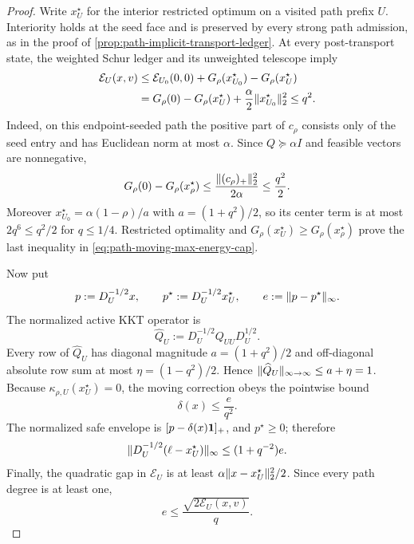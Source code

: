 \begin{proof}
Write $x_{U}^{\star}$ for the interior restricted optimum on a visited path
prefix $U$.  Interiority holds at the seed face and is preserved by every
strong path admission, as in the proof of
\cref{prop:path-implicit-transport-ledger}.  At every post-transport state,
the weighted Schur ledger and its unweighted telescope imply
\begin{align}
 \mathcal E_U(x,v)
 &\leq \mathcal E_{U_0}(0,0)
       +G_\rho(x_{U_0}^{\star})-G_\rho(x_U^{\star})\notag\\
 &=G_\rho(0)-G_\rho(x_U^{\star})
   +\frac{\alpha}{2}\lVert x_{U_0}^{\star}\rVert_2^2
 \leq q^2.
 \label{eq:path-moving-max-energy-cap}
\end{align}
Indeed, on this endpoint-seeded path the positive part of $c_\rho$ consists
only of the seed entry and has Euclidean norm at most $\alpha$.  Since
$Q\succeq\alpha I$ and feasible vectors are nonnegative,
\begin{equation*}
 G_\rho(0)-G_\rho(x_\rho^\star)
 \leq\frac{\lVert(c_\rho)_+\rVert_2^2}{2\alpha}
 \leq\frac{q^2}{2}.
\end{equation*}
Moreover
$x_{U_0}^{\star}=\alpha(1-\rho)/a$ with $a=(1+q^2)/2$, so its center term is
at most $2q^6\leq q^2/2$ for $q\leq1/4$.  Restricted optimality and
$G_\rho(x_U^\star)\geq G_\rho(x_\rho^\star)$ prove the last inequality in
\cref{eq:path-moving-max-energy-cap}.

Now put
\begin{equation*}
 p:=D_U^{-1/2}x,
 \qquad p^\star:=D_U^{-1/2}x_U^\star,
 \qquad e:=\lVert p-p^\star\rVert_\infty.
\end{equation*}
The normalized active KKT operator is
\begin{equation*}
 \widehat Q_U:=D_U^{-1/2}Q_{UU}D_U^{1/2}.
\end{equation*}
Every row of $\widehat Q_U$ has diagonal magnitude
$a=(1+q^2)/2$ and off-diagonal absolute row sum at most
$\eta=(1-q^2)/2$.  Hence
$\lVert\widehat Q_U\rVert_{\infty\to\infty}\leq a+\eta=1$.  Because
$\kappa_{\rho,U}(x_U^\star)=0$, the moving correction obeys the pointwise
bound
\begin{equation}
 \delta(x)
 \leq\frac{e}{q^2}.
 \label{eq:path-moving-max-delta-energy-a}
\end{equation}
The normalized safe envelope is $[p-\delta(x)\mathbf{1}]_+$, and $p^\star\geq0$;
therefore
\begin{equation}
 \lVert D_U^{-1/2}(\ell-x_U^\star)\rVert_\infty
 \leq (1+q^{-2})e.
 \label{eq:path-moving-max-envelope-error}
\end{equation}
Finally, the quadratic gap in $\mathcal E_U$ is at least
$\alpha\lVert x-x_U^\star\rVert_2^2/2$.  Since every path degree is at least one,
\begin{equation}
 e\leq\frac{\sqrt{2\mathcal E_U(x,v)}}q.
 \label{eq:path-moving-max-delta-energy-b}
\end{equation}


\end{proof}
